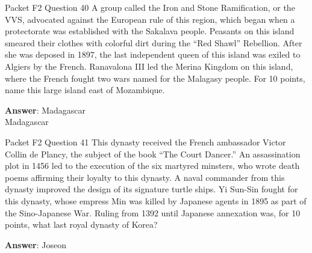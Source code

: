 \begin{frame}{Packet F2 Question 40}
A group called the Iron and Stone Ramification, or the VVS, advocated against the European rule of this region, which began when a protectorate was established with the Sakalava people. Peasants on this island smeared their clothes with colorful dirt during the “Red Shawl” Rebellion. After she was deposed in 1897, the last independent queen of this island was exiled to Algiers by the French. Ranavalona III led the Merina     Kingdom on this island,   where the French fought two wars named for the Malagasy people. For 10 points, name this large island east of Mozambique.  

\textbf{Answer}: Madagascar\\
 Madagascar
\end{frame}

\begin{frame}{Packet F2 Question 41}
This dynasty received the French ambassador Victor Collin de Plancy, the subject of the book ``The Court Dancer.'' An assassination plot in 1456 led to the execution of the six martyred minsters, who wrote death poems affirming their loyalty to this dynasty. A naval commander from this dynasty improved the design of its signature turtle ships. Yi Sun-Sin fought   for this dynasty, whose empress Min was   killed by Japanese agents in 1895 as part   of the Sino-Japanese War. Ruling from 1392 until Japanese   annexation was, for 10 points, what last royal dynasty of Korea?

\textbf{Answer}: Joseon\\
\end{frame}

